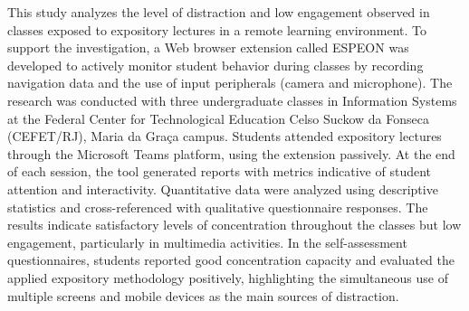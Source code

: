 
This study analyzes the level of distraction and low engagement observed in classes exposed to expository lectures in a remote learning environment. To support the investigation, a Web browser extension called ESPEON was developed to actively monitor student behavior during classes by recording navigation data and the use of input peripherals (camera and microphone). The research was conducted with three undergraduate classes in Information Systems at the Federal Center for Technological Education Celso Suckow da Fonseca (CEFET/RJ), Maria da Graça campus. Students attended expository lectures through the Microsoft Teams platform, using the extension passively. At the end of each session, the tool generated reports with metrics indicative of student attention and interactivity. Quantitative data were analyzed using descriptive statistics and cross-referenced with qualitative questionnaire responses. The results indicate satisfactory levels of concentration throughout the classes but low engagement, particularly in multimedia activities. In the self-assessment questionnaires, students reported good concentration capacity and evaluated the applied expository methodology positively, highlighting the simultaneous use of multiple screens and mobile devices as the main sources of distraction.
